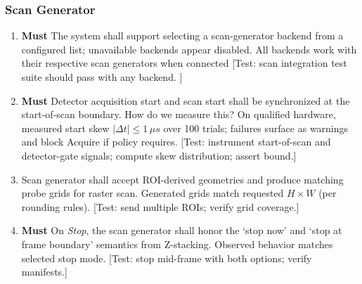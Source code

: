 \documentclass[10pt]{article}
\newcommand{\PriorityTag}[2]{%
  \colorbox{#2!25}{\footnotesize\textsf{\textbf{#1}}}\hspace{0.6em}}
\newcommand{\must}{\leavevmode\PriorityTag{Must}{green}}
\newcounter{reqgrp}[section] %
\newcounter{reqno}
\newcommand{\reqprefix}{GEN}
\newenvironment{requirements}[1]{%
  \renewcommand{\reqprefix}{#1}%
  \refstepcounter{reqgrp}%
  \setcounter{reqno}{0}%
  \begin{enumerate}[leftmargin=*]
}{\end{enumerate}}
\begin{document}
\subsubsection{Scan Generator}
\begin{requirements}{SCN}

\item \must {}
  {The system shall support selecting a scan-generator backend from a configured list; unavailable backends appear disabled.}
  {All backends work with their respective scan generators when connected}
  [Test: scan integration test suite should pass with any backend. ]

\item \must {}
  {Detector acquisition start and scan start shall be synchronized at the start-of-scan boundary. How do we measure this?}
  {On qualified hardware, measured start skew \(|\Delta t|\le 1\,\mu s\) over 100 trials; failures surface as warnings and block Acquire if policy requires.}
  [Test: instrument start-of-scan and detector-gate signals; compute skew distribution; assert bound.]

\item {}
  {Scan generator shall accept ROI-derived geometries and produce matching probe grids for raster scan.}
  {Generated grids match requested \(H\times W\) (per rounding rules).}
  [Test: send multiple ROIs; verify grid coverage.]

\item \must {}
  {On \emph{Stop}, the scan generator shall honor the `stop now' and `stop at frame boundary' semantics from Z-stacking.}
  {Observed behavior matches selected stop mode.}
  [Test: stop mid-frame with both options; verify manifests.]
\end{requirements}
\end{document}
